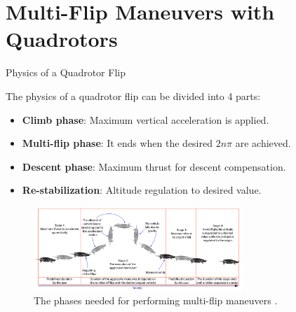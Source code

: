 \documentclass{thesisbeamer}
\begin{document}
\section{Multi-Flip Maneuvers with Quadrotors}

\begin{frame}[t]{Physics of a Quadrotor Flip}

The physics of a quadrotor flip can be divided into 4 parts:

\begin{itemize}[<+->]
	\item \textbf{Climb phase}: Maximum vertical acceleration is applied.
	\item \textbf{Multi-flip phase}: It ends when the desired $2n\pi$ are achieved.
	\item \textbf{Descent phase}: Maximum thrust for descent compensation.
	\item \textbf{Re-stabilization}: Altitude regulation to desired value. 
\end{itemize}


\begin{figure}[h]
\centering
\includegraphics[width=0.7\textwidth]{Images/Flip/Physics}
\caption{The phases needed for performing multi-flip maneuvers \cite{Castillo2018}.}
\label{flipping_physics}
\end{figure}
\end{frame}
\end{document}

